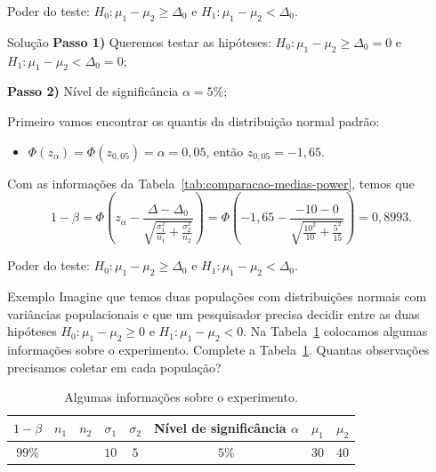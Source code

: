 \documentclass[9pt]{beamer}
\begin{document}
\begin{frame}{Poder do teste: $H_0:\mu_1 - \mu_2 \geq \Delta_0$ e $H_1: \mu_1 - \mu_2 < \Delta_0$.}
	\begin{block}{Solução}
		\textbf{Passo 1)} Queremos testar as hipóteses: $H_0: \mu_1 - \mu_2 \geq \Delta_0 = 0$  e $H_1: \mu_1 - \mu_2 < \Delta_0=0$;
		
		\textbf{Passo 2)} Nível de significância $\alpha=5\%$;
		
		Primeiro vamos encontrar os quantis da distribuição normal padrão:
		\begin{itemize}
			\item $\Phi\left(z_\alpha\right) = \Phi\left(z_{0,05}\right) = \alpha = 0,05$, então $z_{0,05} = -1,65$.
		\end{itemize}
		\vfill
		
		Com as informações da Tabela~\ref{tab:comparacao-medias-power}, temos que 
		$$1-\beta=\Phi\left( z_\alpha - \frac{\Delta - \Delta_0}{\sqrt{ \frac{\sigma_1^2}{n_1} + \frac{\sigma_2^2}{n_2} }} \right)=\Phi\left( -1,65 - \frac{-10 - 0}{\sqrt{ \frac{10^2}{10} + \frac{5^2}{15} }} \right)=0,8993.$$
	\end{block}
\end{frame}

\begin{frame}{Poder do teste: $H_0:\mu_1 - \mu_2 \geq \Delta_0$ e $H_1: \mu_1 - \mu_2 < \Delta_0$.}

\Large

\begin{block}{Exemplo}
	Imagine que temos duas populações com distribuições normais com variâncias populacionais e que um pesquisador precisa decidir entre as duas hipóteses $H_0: \mu_1 - \mu_2 \geq 0$ e $H_1: \mu_1 - \mu_2 < 0$. Na Tabela~\ref{tab:comparacao-medias-sample-size} colocamos algumas informações sobre o experimento. Complete a Tabela~\ref{tab:comparacao-medias-sample-size}. Quantas observações precisamos coletar em cada população?
	\begin{table}[htbp]
		\centering
		\begin{tabular}{c|c|c|c|c|c|c|c}
			\toprule[0.05cm]
			$1-\beta$ & $n_1$ & $n_2$ & 	 $\sigma_1$ & $\sigma_2$ & Nível de significância $\alpha$ & $\mu_1$ & $\mu_2$\\  \midrule[0.025cm]
			$99\%$ &  &  & 	 $10$ & $5$ & $5\%$ & $30$ & $40$\\ \bottomrule[0.05cm] 
		\end{tabular}
		\caption{Algumas informações sobre o experimento.}
		\label{tab:comparacao-medias-sample-size}
	\end{table}	
\end{block}

\normalsize
\end{frame}
\end{document}
